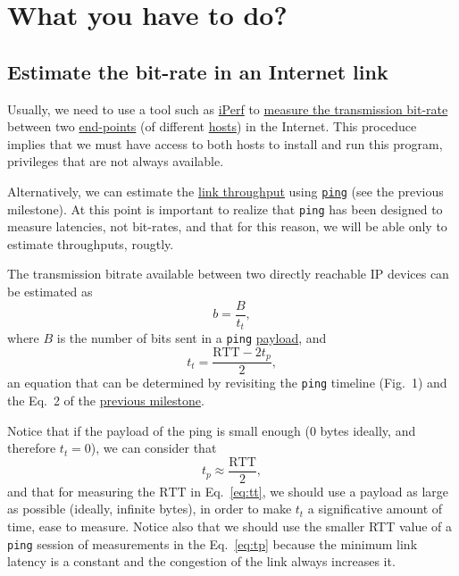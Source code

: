 \section{What you have to do?}

\subsection{Estimate the bit-rate in an Internet link}

Usually, we need to use a tool such as \href{https://iperf.fr/}{iPerf}
to
\href{https://en.wikipedia.org/wiki/Measuring_network_throughput}{measure
  the transmission bit-rate} between
two \href{https://datatracker.ietf.org/doc/html/rfc4113}{end-points}
(of
different \href{https://en.wikipedia.org/wiki/Host_(network)}{hosts})
in the Internet. This proceduce implies that we must have access to
both hosts to install and run this program, privileges that are not
always available.

Alternatively, we can estimate the
\href{https://en.wikipedia.org/wiki/Throughput}{link throughput} using
\href{https://github.com/torvalds/linux/blob/master/net/ipv4/ping.c}{\texttt{ping}}
(see the previous milestone). At this point is important to realize
that \texttt{ping} has been designed to measure latencies, not
bit-rates, and that for this reason, we will be able only to estimate
throughputs, rougtly.

The transmission bitrate available between two directly reachable IP
devices can be estimated as
\begin{equation}
  b=\frac{B}{t_t},
  \label{eq:b}
\end{equation}
where $B$ is the number of bits sent in a \verb|ping|
\href{https://en.wikipedia.org/wiki/Payload_(computing)}{payload}, and
\begin{equation}
  t_t = \frac{\text{RTT}-2t_p}{2},
  \label{eq:tt}
\end{equation}
an equation that can be determined by revisiting the \verb|ping|
timeline (Fig.~1) and the Eq.~2 of the
\href{https://tecnologias-multimedia.github.io/study_guide/06-jitter_impact/}{previous
  milestone}.

Notice that if the payload of the ping is small enough ($0$ bytes
ideally, and therefore $t_t=0$), we can consider that
\begin{equation}
  t_p \approx \frac{\text{RTT}}{2},
  \label{eq:tp}
\end{equation}
and that for measuring the $\text{RTT}$ in
Eq.~\ref{eq:tt}, we should use a payload as large as possible
(ideally, infinite bytes), in order to make $t_t$ a significative
amount of time, ease to measure. Notice also that we should use the
smaller RTT value of a \texttt{ping} session of measurements in the
Eq.~\ref{eq:tp} because the minimum link latency is a constant and the
congestion of the link always increases it.

